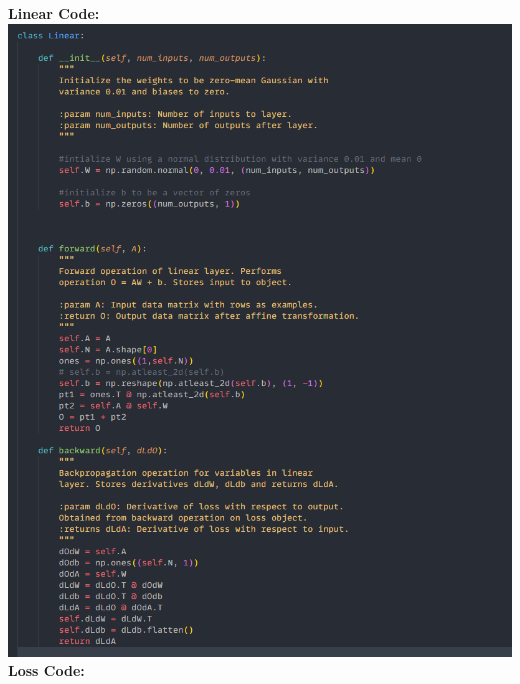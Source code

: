 \documentclass{article}[12pt]
\begin{document}
\textbf{Linear Code:}\\
\includegraphics[width=1\textwidth]{LinearCode.png}\\
\textbf{Loss Code:}\\
\end{document}
